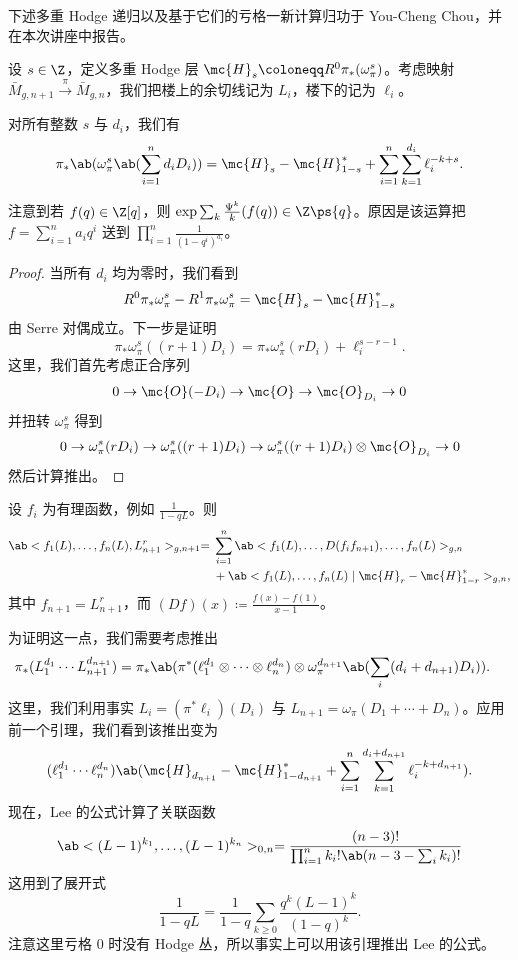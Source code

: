 下述多重 Hodge 递归以及基于它们的亏格一新计算归功于 You-Cheng Chou，并在本次讲座中报告。

设 \(s \in \Z\)，定义多重 Hodge 层 \(\mc{H}_s \coloneqq R^0 \pi_* (\omega_{\pi}^s)\)。考虑映射 \(\bar{M}_{g,n+1} \xrightarrow{\pi} \bar{M}_{g,n}\)，我们把楼上的余切线记为 \(L_i\)，楼下的记为 \(\ell_i\)。

\begin{lem}
    对所有整数 \(s\) 与 \(d_i\)，我们有
    \[ \pi_*\ab(\omega_{\pi}^s\ab(\sum_{i=1}^n d_i D_i)) = \mc{H}_s-\mc{H}_{1-s}^* + \sum_{i=1}^n \sum_{k=1}^{d_i} \ell_i^{-k+s}. \]
\end{lem}

\begin{rmk}
    注意到若 \(f(q) \in \Z[q]\)，则 \(\exp \sum_k \frac{\Psi^k}{k} (f(q)) \in \Z \ps{q}\)。原因是该运算把 \(f = \sum_{i=1}^{n} a_i q^i\) 送到 \(\prod_{i=1}^n \frac{1}{(1-q^i)^{a_i}}\)。
\end{rmk}

\begin{proof}
    当所有 \(d_i\) 均为零时，我们看到
    \[ R^0 \pi_* \omega_{\pi}^s - R^1 \pi_* \omega_{\pi}^s = \mc{H}_s - \mc{H}_{1-s}^* \]
    由 Serre 对偶成立。下一步是证明
    \[ \pi_* \omega_{\pi}^s ((r+1)D_i) = \pi_* \omega_{\pi}^s(r D_i) + \ell_i^{s-r-1}. \]
    这里，我们首先考虑正合序列
    \[ 0 \to \mc{O} (-D_i) \to \mc{O} \to \mc{O}_{D_i} \to 0 \]
    并扭转 \(\omega_{\pi}^s\) 得到
    \[ 0 \to \omega_{\pi}^s(r D_i) \to \omega_{\pi}^s ((r+1)D_i) \to \omega_{\pi}^s ((r+1)D_i) \otimes \mc{O}_{D_i} \to 0 \]
    然后计算推出。
\end{proof}

\begin{lem}
    设 \(f_i\) 为有理函数，例如 \(\frac{1}{1-q L}\)。则
    \begin{align*}
        \ab<f_1(L), \ldots, f_n(L), L_{n+1}^r>_{g, n+1} ={}& \sum_{i=1}^n \ab<f_1(L), \ldots, D(f_i f_{n+1}), \ldots, f_n(L)>_{g, n} \\
        &+ \ab<f_1(L), \ldots, f_n(L) \mid \mc{H}_r - \mc{H}_{1-r}^*>_{g,n},
    \end{align*}
    其中 \(f_{n+1} = L_{n+1}^r\)，而 \((Df)(x) \coloneqq \frac{f(x)-f(1)}{x-1}\)。
\end{lem}

为证明这一点，我们需要考虑推出
\begin{align*}
    \pi_* (L_1^{d_1} \cdots L_{n+1}^{d_{n+1}}) &= \pi_* \ab(\pi^*(\ell_1^{d_1} \otimes \cdots \otimes \ell_n^{d_n}) \otimes \omega_{\pi}^{d_{n+1}}\ab(\sum_i (d_i+d_{n+1})D_i)).
\end{align*}
这里，我们利用事实 \(L_i = (\pi^* \ell_i)(D_i)\) 与 \(L_{n+1} = \omega_{\pi}(D_1 + \cdots + D_n)\)。应用前一个引理，我们看到该推出变为
\[ (\ell_1^{d_1} \cdots \ell_n^{d_n})\ab(\mc{H}_{d_{n+1}} - \mc{H}_{1-d_{n+1}}^* + \sum_{i=1}^n \sum_{k=1}^{d_i + d_{n+1}} \ell_i^{-k+d_{n+1}}). \]
现在，Lee 的公式计算了关联函数
\[ \ab<(L-1)^{k_1}, \ldots, (L-1)^{k_n}>_{0,n} = \frac{(n-3)!}{\prod_{i=1}^n k_i! \ab(n-3-\sum_i k_i)!} \]
这用到了展开式
\[ \frac{1}{1-qL} = \frac{1}{1-q} \sum_{k \geq 0} \frac{q^k(L-1)^k}{(1-q)^k}. \]
注意这里亏格 \(0\) 时没有 Hodge 丛，所以事实上可以用该引理推出 Lee 的公式。

